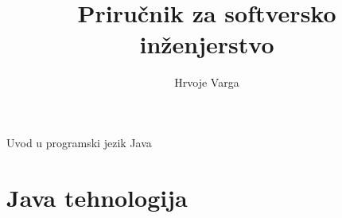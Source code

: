 


    \author{Hrvoje Varga}
    \title{Priručnik za softversko inženjerstvo}
    
    \frontmatter
        \pagestyle{empty}
        
        \tableofcontents
        \listoffigures
        
    
    \mainmatter
        \pagestyle{fancy}
        \begin{part}{Uvod u programski jezik Java}
            \chapter{Java tehnologija}
            
        \end{part}
